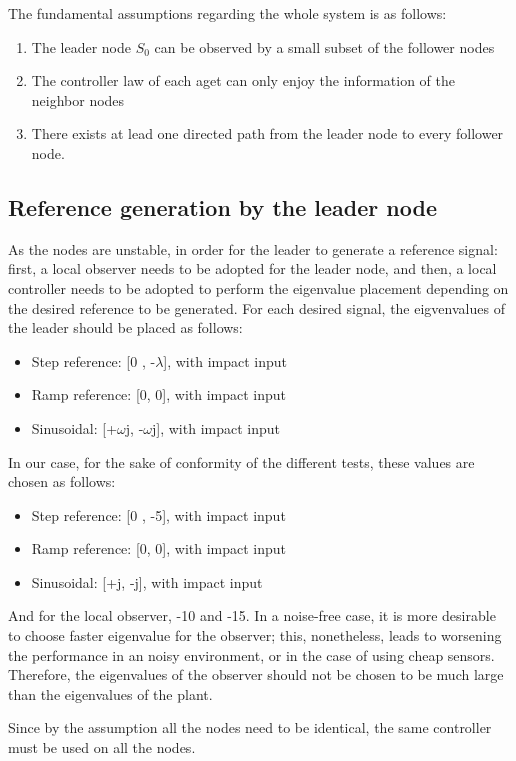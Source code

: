 The fundamental assumptions regarding the whole system is as follows:
\begin{enumerate}
	\item The leader node $S_0$ can be observed by a small subset of the follower nodes
	\item The controller law of each aget can only enjoy the information of the neighbor nodes
	\item There exists at lead one directed path from the leader node to every follower node.
\end{enumerate}

\subsection{Reference generation by the leader node}
As the nodes are unstable, in order for the leader to generate a reference signal: first, a local observer needs to be adopted for the leader node, and then, a local controller needs to be adopted to perform the eigenvalue placement depending on the desired reference to be generated. For each desired signal, the eigvenvalues of the leader should be placed as follows:
\begin{itemize}
	\item Step reference: [0 , -$\lambda$], with impact input 
	\item Ramp reference: [0, 0], with impact input
	\item Sinusoidal: [+$\omega$j,  -$\omega$j], with impact input
\end{itemize}

In our case, for the sake of conformity of the different tests, these values are chosen as follows:
\begin{itemize}
	\item Step reference: [0 , -5], with impact input 
	\item Ramp reference: [0, 0], with impact input
	\item Sinusoidal: [+j,  -j], with impact input
\end{itemize}

And for the local observer, -10 and -15. In a noise-free case, it is more desirable to choose faster eigenvalue for the observer; this, nonetheless, leads to worsening the performance in an noisy environment, or in the case of using cheap sensors. Therefore, the eigenvalues of the observer should not be chosen to be much large than the eigenvalues of the plant.

Since by the assumption all the nodes need to be identical, the same controller must be used on all the nodes.

